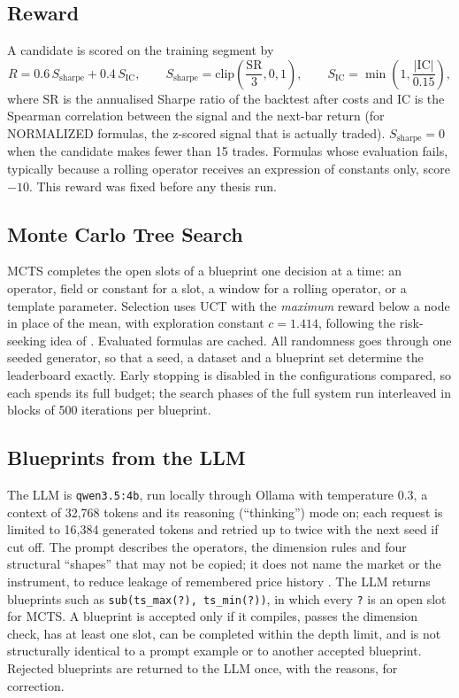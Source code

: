 \documentclass[12pt,a4paper,oneside]{book}
\theoremstyle{definition}
\newcommand{\code}[1]{\texttt{#1}}
\begin{document}
\subsection{Reward}

A candidate is scored on the training segment by
\begin{equation}
R = 0.6\, S_{\mathrm{sharpe}} + 0.4\, S_{\mathrm{IC}}, \qquad
S_{\mathrm{sharpe}} = \mathrm{clip}\!\left(\frac{\mathrm{SR}}{3}, 0, 1\right), \qquad
S_{\mathrm{IC}} = \min\!\left(1, \frac{|\mathrm{IC}|}{0.15}\right),
\label{eq:reward}
\end{equation}
where SR is the annualised Sharpe ratio of the backtest after costs and IC is the Spearman correlation between the signal and the next-bar return (for NORMALIZED formulas, the z-scored signal that is actually traded). $S_{\mathrm{sharpe}} = 0$ when the candidate makes fewer than 15 trades. Formulas whose evaluation fails, typically because a rolling operator receives an expression of constants only, score $-10$. This reward was fixed before any thesis run.

\subsection{Monte Carlo Tree Search}

MCTS completes the open slots of a blueprint one decision at a time: an operator, field or constant for a slot, a window for a rolling operator, or a template parameter. Selection uses UCT with the \emph{maximum} reward below a node in place of the mean, with exploration constant $c = 1.414$, following the risk-seeking idea of \cite{ren2024}. Evaluated formulas are cached. All randomness goes through one seeded generator, so that a seed, a dataset and a blueprint set determine the leaderboard exactly. Early stopping is disabled in the configurations compared, so each spends its full budget; the search phases of the full system run interleaved in blocks of 500 iterations per blueprint.

\subsection{Blueprints from the LLM}

The LLM is \code{qwen3.5:4b}, run locally through Ollama with temperature 0.3, a context of 32,768 tokens and its reasoning (``thinking'') mode on; each request is limited to 16,384 generated tokens and retried up to twice with the next seed if cut off. The prompt describes the operators, the dimension rules and four structural ``shapes'' that may not be copied; it does not name the market or the instrument, to reduce leakage of remembered price history \cite{glasserman2023}. The LLM returns blueprints such as \code{sub(ts\_max(?), ts\_min(?))}, in which every \code{?} is an open slot for MCTS. A blueprint is accepted only if it compiles, passes the dimension check, has at least one slot, can be completed within the depth limit, and is not structurally identical to a prompt example or to another accepted blueprint. Rejected blueprints are returned to the LLM once, with the reasons, for correction.
\end{document}
